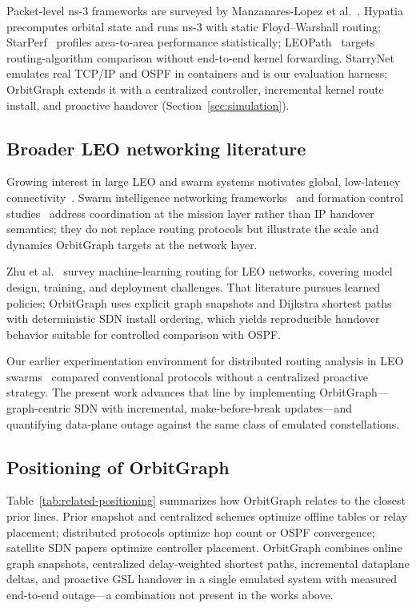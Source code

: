 Packet-level ns-3 frameworks are surveyed by
Manzanares-Lopez et al.~\cite{manzanareslopez2025comprehensive}.
Hypatia~\cite{kassing2020exploring} precomputes orbital state and runs ns-3
with static Floyd--Warshall routing; StarPerf~\cite{lai2020starperf} profiles
area-to-area performance statistically; LEOPath~\cite{leopath2024} targets
routing-algorithm comparison without end-to-end kernel forwarding.
StarryNet~\cite{lai2023starrynet} emulates real TCP/IP and OSPF in containers
and is our evaluation harness; OrbitGraph extends it with a centralized
controller, incremental kernel route install, and proactive handover
(Section~\ref{sec:simulation}).

\subsection{Broader LEO networking literature}

Growing interest in large LEO and swarm systems motivates global, low-latency
connectivity~\cite{smallsats2020,asri2024swarm,farrag:swarm-survey:2021}.
Swarm intelligence networking frameworks~\cite{chen2022swarm} and formation
control studies~\cite{fangchen2022pdg} address coordination at the mission
layer rather than IP handover semantics; they do not replace routing protocols
but illustrate the scale and dynamics OrbitGraph targets at the network layer.

Zhu et al.~\cite{zhu:ml-routing-survey:2025} survey machine-learning routing
for LEO networks, covering model design, training, and deployment challenges.
That literature pursues learned policies; OrbitGraph uses explicit graph
snapshots and Dijkstra shortest paths with deterministic SDN install ordering,
which yields reproducible handover behavior suitable for controlled comparison
with OSPF.

Our earlier experimentation environment for distributed routing analysis in LEO
swarms~\cite{online:silleo-routing:2025} compared conventional protocols without
a centralized proactive strategy.
The present work advances that line by implementing OrbitGraph---graph-centric
SDN with incremental, make-before-break updates---and quantifying data-plane
outage against the same class of emulated constellations.

\subsection{Positioning of OrbitGraph}

Table~\ref{tab:related-positioning} summarizes how OrbitGraph relates to the
closest prior lines.
Prior snapshot and centralized schemes optimize offline tables or relay
placement; distributed protocols optimize hop count or OSPF convergence;
satellite SDN papers optimize controller placement.
OrbitGraph combines online graph snapshots, centralized delay-weighted
shortest paths, incremental dataplane deltas, and proactive GSL handover in a
single emulated system with measured end-to-end outage---a combination not
present in the works above.

